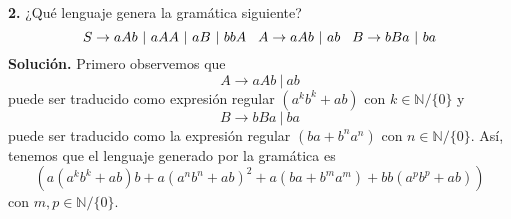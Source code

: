 \textbf{2.} ¿Qué lenguaje genera la gramática siguiente?
\[S \rightarrow aAb\ |\ aAA\ |\ aB\ |\ bbA \hspace*{0.3cm} A \rightarrow aAb\ |\ ab \hspace*{0.3cm} B \rightarrow bBa\ |\ ba\]
\textbf{Solución.} Primero observemos que
\[A \rightarrow aAb\ |\ ab\]
puede ser traducido como expresión regular $(a^kb^k + ab)$ con $k \in \mathbb{N}/\{0\}$ y
\[B \rightarrow bBa\ |\ ba\]
puede ser traducido como la expresión regular $(ba + b^na^n)$ con $n \in \mathbb{N}/\{0\}$. Así, tenemos que el lenguaje
generado por la gramática es
\[\left(a(a^kb^k + ab)b + a(a^nb^n + ab)^2 + a(ba + b^ma^m) + bb(a^pb^p + ab)\right)\]
con $m, p \in \mathbb{N}/\{0\}$.

